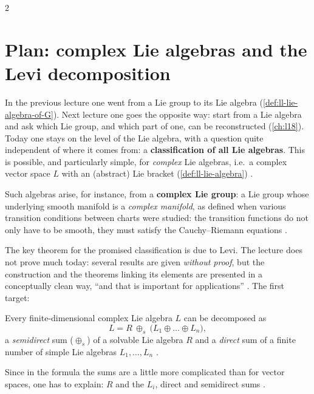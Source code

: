 \begin{paracol}{2}
\section{Plan: complex Lie algebras and the Levi decomposition}\label{sec:cl-plan}

In the previous lecture one went from a Lie group to its Lie algebra (\cref{def:ll-lie-algebra-of-G}). Next lecture one goes the opposite way: start from a Lie algebra and ask which Lie group, and which part of one, can be reconstructed (\cref{ch:l18}). Today one stays on the level of the Lie algebra, with a question quite independent of where it comes from: a \textbf{classification of all Lie algebras}. This is possible, and particularly simple, for \emph{complex} Lie algebras, i.e.\ a complex vector space $L$ with an (abstract) Lie bracket (\cref{def:ll-lie-algebra})    .

Such algebras arise, for instance, from a \textbf{complex Lie group}: a Lie group whose underlying smooth manifold is a \emph{complex manifold}, as defined when various transition conditions between charts were studied: the transition functions do not only have to be smooth, they must satisfy the Cauchy--Riemann equations   .

The key theorem for the promised classification is due to Levi. The lecture does not prove much today: several results are given \emph{without proof}, but the construction and the theorems linking its elements are presented in a conceptually clean way, ``and that is important for applications''  . The first target:
\begin{theorem}\label{thm:cl-levi}
Every finite-dimensional complex Lie algebra $L$ can be decomposed as
\[
  L=R\ \oplus_s\ \bigl(L_1\oplus\dots\oplus L_n\bigr),
\]
a \emph{semidirect} sum ($\oplus_s$) of a solvable Lie algebra $R$ and a \emph{direct} sum of a finite number of simple Lie algebras $L_1,\dots,L_n$    .
\end{theorem}
Since in the formula the sums are a little more complicated than for vector spaces, one has to explain: $R$ and the $L_i$, direct and semidirect sums .


\end{paracol}
